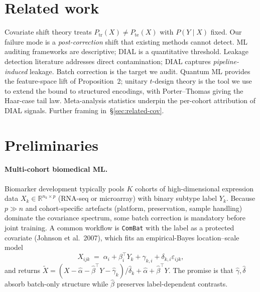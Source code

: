 \documentclass[letterpaper,11pt]{article}
\newcommand{\R}{\mathbb{R}}
\begin{document}
\section{Related work}
\label{sec:related}

Covariate shift theory \cite{shimodaira2000,sugiyama2007,gretton2009}
treats $P_{\text{tr}}(X)\ne P_{\text{te}}(X)$ with $P(Y\mid X)$ fixed.
Our failure mode is a \emph{post-correction} shift that existing
methods cannot detect.  ML auditing frameworks
\cite{mitchell2019modelcards,gebru2021datasheets,damour2020} are
descriptive; DIAL is a quantitative threshold.  Leakage detection
literature \cite{kaufman2012leakage,samala2020medical}
addresses direct contamination; DIAL captures \emph{pipeline-induced}
leakage.  Batch correction \cite{johnson2007combat,leek2010sva,
buttner2019scib,korsunsky2019harmony,lopez2018scvi} is the target we
audit.  Quantum ML \cite{havlicek2019nature,schuld2019prl,
huang2021quantumML,schuld2021reuploading,liu2021quantum} provides the
feature-space lift of Proposition~2; unitary $t$-design theory
\cite{harrowLow2009tdesigns,brandao2016localtdesigns} is the tool
we use to extend the bound to structured encodings, with Porter--Thomas
\cite{porterThomas1956,haake2010qchaos} giving the Haar-case tail law.  Meta-analysis statistics
\cite{dersimonian1986,han2011metasoft,benavoli2017bayesML,lee2022metaanc}
underpin the per-cohort attribution of DIAL signals.  Further
framing in~\S\ref{sec:related-cov}.

\section{Preliminaries}
\label{sec:prelim}

\paragraph{Multi-cohort biomedical ML.}
Biomarker development typically pools $K$ cohorts of high-dimensional
expression data $X_k\in\R^{n_k\times p}$ (RNA-seq or microarray) with
binary subtype label $Y_k$. Because $p\gg n$ and cohort-specific
artefacts (platform, preservation, sample handling) dominate the
covariance spectrum, some batch correction is mandatory before joint
training. A common workflow is \texttt{ComBat} with the label as a
protected covariate (Johnson et al.~2007), which fits an
empirical-Bayes location--scale model
\[
   X_{ijk} \;=\; \alpha_i + \beta_i^{\!\top}Y_k + \gamma_{k,i} + \delta_{k,i}\varepsilon_{ijk},
\]
and returns $\tilde X = (X - \hat\alpha - \hat\beta^{\!\top}Y - \hat\gamma_k)/\hat\delta_k + \hat\alpha + \hat\beta^{\!\top}Y$.
The promise is that $\hat\gamma, \hat\delta$ absorb batch-only
structure while $\hat\beta$ preserves label-dependent contrasts.
\end{document}
